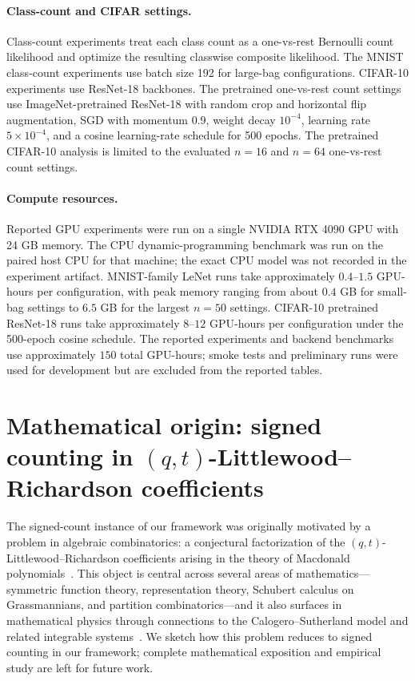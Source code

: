 \paragraph{Class-count and CIFAR settings.}
Class-count experiments treat each class count as a one-vs-rest Bernoulli count likelihood and optimize the resulting classwise composite likelihood.
The MNIST class-count experiments use batch size 192 for large-bag configurations.
CIFAR-10 experiments use ResNet-18 backbones.
The pretrained one-vs-rest count settings use ImageNet-pretrained ResNet-18 with random crop and horizontal flip augmentation, SGD with momentum 0.9, weight decay $10^{-4}$, learning rate $5\times 10^{-4}$, and a cosine learning-rate schedule for 500 epochs.
The pretrained CIFAR-10 analysis is limited to the evaluated $n=16$ and $n=64$ one-vs-rest count settings.

\paragraph{Compute resources.}
Reported GPU experiments were run on a single NVIDIA RTX 4090 GPU with 24 GB memory.
The CPU dynamic-programming benchmark was run on the paired host CPU for that machine; the exact CPU model was not recorded in the experiment artifact.
MNIST-family LeNet runs take approximately $0.4$--$1.5$ GPU-hours per configuration, with peak memory ranging from about $0.4$ GB for small-bag settings to $6.5$ GB for the largest $n=50$ settings.
CIFAR-10 pretrained ResNet-18 runs take approximately $8$--$12$ GPU-hours per configuration under the 500-epoch cosine schedule.
The reported experiments and backend benchmarks use approximately $150$ total GPU-hours; smoke tests and preliminary runs were used for development but are excluded from the reported tables.

\section{Mathematical origin: signed counting in \texorpdfstring{$(q,t)$}{(q,t)}-Littlewood--Richardson coefficients}
\label{app:qtlr-origin}

The signed-count instance of our framework was originally motivated by a problem in algebraic combinatorics: a conjectural factorization of the $(q,t)$-Littlewood--Richardson coefficients arising in the theory of Macdonald polynomials~\cite{Macdonald1995}.
This object is central across several areas of mathematics---symmetric function theory, representation theory, Schubert calculus on Grassmannians, and partition combinatorics---and it also surfaces in mathematical physics through connections to the Calogero--Sutherland model and related integrable systems~\cite{LittlewoodRichardson1934,KnutsonTao1999,Vakil2006}.
We sketch how this problem reduces to signed counting in our framework; complete mathematical exposition and empirical study are left for future work.

